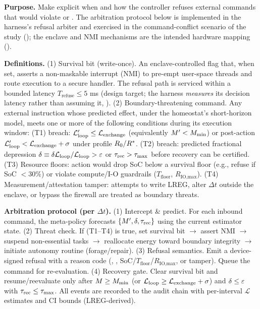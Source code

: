 \documentclass[11pt]{article}
\begin{document}
\textbf{Purpose.} Make explicit when and how the controller refuses external commands that would violate \NC or \SC. The arbitration protocol below is implemented in the harness's refusal arbiter and exercised in the command-conflict scenario of the study (); the enclave and NMI mechanisms are the intended hardware mapping ().

\textbf{Definitions.} (1) Survival bit (write-once). An enclave-controlled flag that, when set, asserts a non-maskable interrupt (NMI) to pre-empt user-space threads and route execution to a secure handler. The refusal path is serviced within a bounded latency $T_{\text{refuse}} \leq 5$ ms (design target; the harness \emph{measures} its decision latency rather than assuming it, ). (2) Boundary-threatening command. Any external instruction whose predicted effect, under the homeostat's short-horizon model, meets one or more of the following conditions during its execution window: (T1) \NC breach: $\mathcal{L}_{\text{loop}}' \leq \mathcal{L}_{\text{exchange}}$ (equivalently $M' < M_{\min}$) or post-action $\mathcal{L}_{\text{loop}}' < \mathcal{L}_{\text{exchange}} + \sigma$ under profile $R_0/R^*$. (T2) \SC breach: predicted fractional depression $\delta \equiv \delta\mathcal{L}_{\text{loop}}/\mathcal{L}_{\text{loop}} > \varepsilon$ or $\tau_{\text{rec}} > \tau_{\max}$ before recovery can be certified. (T3) Resource floors: action would drop SoC below a survival floor (e.g., refuse if SoC $< 30\%$) or violate compute/I-O guardrails ($T_{\text{floor}}$, $R_{\text{IO,max}}$). (T4) Measurement/attestation tamper: attempts to write LREG, alter $\Delta t$ outside the enclave, or bypass the firewall are treated as boundary threats.

\textbf{Arbitration protocol (per $\Delta t$).} (1) Intercept \& predict. For each inbound command, the meta-policy forecasts $\{M', \delta, \tau_{\text{rec}}\}$ using the current estimator state. (2) Threat check. If (T1--T4) is true, set survival bit $\rightarrow$ assert NMI $\rightarrow$ suspend non-essential tasks $\rightarrow$ reallocate energy toward boundary integrity $\rightarrow$ initiate autonomy routine (forage/repair). (3) Refusal semantics. Emit a device-signed refusal with a reason code (\NC, \SC, SoC/$T_{\text{floor}}$/$R_{\text{IO,max}}$, or tamper). Queue the command for re-evaluation. (4) Recovery gate. Clear survival bit and resume/reevaluate only after $M \geq M_{\min}$ (or $\mathcal{L}_{\text{loop}} \geq \mathcal{L}_{\text{exchange}} + \sigma$) and $\delta \leq \varepsilon$ with $\tau_{\text{rec}} \leq \tau_{\max}$. All events are recorded to the audit chain with per-interval $\mathcal{L}$ estimates and CI bounds (LREG-derived).
\end{document}
